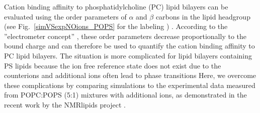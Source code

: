 \documentclass[journal=jpcbfk,manuscript=article]{achemso}
\begin{document}
Cation binding affinity to phosphatidylcholine (PC) lipid bilayers can be evaluated using 
the order parameters of $\alpha$ and $\beta$ carbons in the lipid headgroup 
(see Fig.~\ref{simVSexpNOions_POPS} for the labeling
) \cite{catte16}.
According to the ''electrometer concept'' \citep{seelig87}, these order parameters decrease
proportionally to the bound charge and can therefore be used to quantify the cation binding
affinity to PC lipid bilayers. The situation is more complicated for lipid bilayers containing
PS lipids because the ion free reference state does not exist due to the counterions and additional
ions often lead to phase transitions \cite{nmrlipids_proj4,feigenson86,mattai89,roux91,roux90}
Here, we overcome these complications by comparing simulations to the experimental data measured
from POPC:POPS (5:1) mixtures with additional ions\cite{roux90}, as demonstrated in the
recent work by the NMRlipids project \cite{nmrlipids_proj4}.


 
\end{document}
